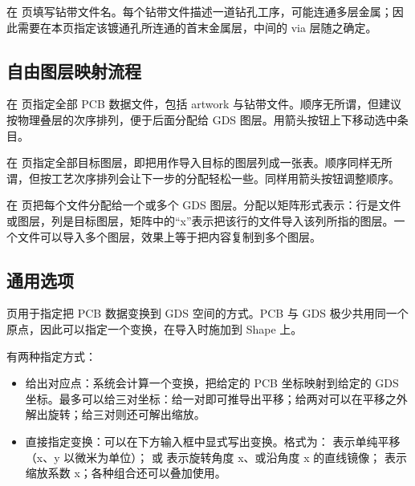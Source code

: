 
在  页填写钻带文件名。每个钻带文件描述一道钻孔工序，可能连通多层金属；因此需要在本页指定该镀通孔所连通的首末金属层，中间的 via 层随之确定。

\subsection{自由图层映射流程}


在  页指定全部 PCB 数据文件，包括 artwork 与钻带文件。顺序无所谓，但建议按物理叠层的次序排列，便于后面分配给 GDS 图层。用箭头按钮上下移动选中条目。


在  页指定全部目标图层，即把用作导入目标的图层列成一张表。顺序同样无所谓，但按工艺次序排列会让下一步的分配轻松一些。同样用箭头按钮调整顺序。


在  页把每个文件分配给一个或多个 GDS 图层。分配以矩阵形式表示：行是文件或图层，列是目标图层，矩阵中的“x”表示把该行的文件导入该列所指的图层。一个文件可以导入多个图层，效果上等于把内容复制到多个图层。

\subsection{通用选项}


 页用于指定把 PCB 数据变换到 GDS 空间的方式。PCB 与 GDS 极少共用同一个原点，因此可以指定一个变换，在导入时施加到 Shape 上。

有两种指定方式：

\begin{itemize}
\item 给出对应点：系统会计算一个变换，把给定的 PCB 坐标映射到给定的 GDS 坐标。最多可以给三对坐标：给一对即可推导出平移；给两对可以在平移之外解出旋转；给三对则还可解出缩放。
\item 直接指定变换：可以在下方输入框中显式写出变换。格式为： 表示单纯平移（x、y 以微米为单位）； 或  表示旋转角度 x、或沿角度 x 的直线镜像； 表示缩放系数 x；各种组合还可以叠加使用。
\end{itemize}

